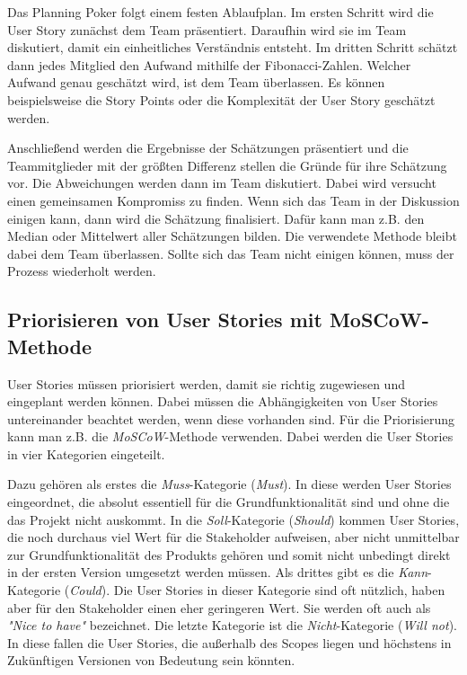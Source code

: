 \documentclass[acmtog]{acmart}
\begin{document}
Das Planning Poker folgt einem festen Ablaufplan. Im ersten Schritt wird die User Story zunächst dem Team präsentiert. Daraufhin wird sie im Team diskutiert, 
damit ein einheitliches Verständnis entsteht. Im dritten Schritt schätzt dann jedes Mitglied den Aufwand mithilfe der Fibonacci-Zahlen. Welcher Aufwand genau 
geschätzt wird, ist dem Team überlassen. Es können beispielsweise die Story Points oder die Komplexität der User Story geschätzt werden. \cite{planingpoker}

Anschließend werden die Ergebnisse der Schätzungen präsentiert und die Teammitglieder mit der größten Differenz stellen die Gründe für ihre Schätzung vor. 
Die Abweichungen werden dann im Team diskutiert. Dabei wird versucht einen gemeinsamen Kompromiss zu finden. Wenn sich das Team in der Diskussion einigen kann, dann wird die Schätzung finalisiert. 
Dafür kann man z.B. den Median oder Mittelwert aller Schätzungen bilden. Die verwendete Methode bleibt dabei dem Team überlassen. Sollte sich das Team nicht einigen können, muss der Prozess wiederholt werden. \cite{planingpoker}

\subsection{Priorisieren von User Stories mit MoSCoW-Methode} \label{sec:priorization}

User Stories müssen priorisiert werden, damit sie richtig zugewiesen und eingeplant werden können. Dabei müssen die Abhängigkeiten von User Stories untereinander 
beachtet werden, wenn diese vorhanden sind. Für die Priorisierung kann man z.B. die \emph{MoSCoW}-Methode verwenden. Dabei werden die User Stories in vier Kategorien eingeteilt. \cite{moscow}

Dazu gehören als erstes die \emph{Muss}-Kategorie (\emph{Must}). In diese werden User Stories eingeordnet, die absolut essentiell für die Grundfunktionalität sind und ohne die das 
Projekt nicht auskommt. In die \emph{Soll}-Kategorie (\emph{Should}) kommen User Stories, die noch durchaus viel Wert für die Stakeholder aufweisen, aber nicht unmittelbar zur Grundfunktionalität 
des Produkts gehören und somit nicht unbedingt direkt in der ersten Version umgesetzt werden müssen. Als drittes gibt es die \emph{Kann}-Kategorie (\emph{Could}). Die User Stories in dieser Kategorie sind oft 
nützlich, haben aber für den Stakeholder einen eher geringeren Wert. Sie werden oft auch als \emph{"Nice to have"} bezeichnet. Die letzte Kategorie ist die \emph{Nicht}-Kategorie 
(\emph{Will not}). In diese fallen die User Stories, die außerhalb des Scopes liegen und höchstens in Zukünftigen Versionen von Bedeutung sein könnten. \cite{moscow}
\end{document}
